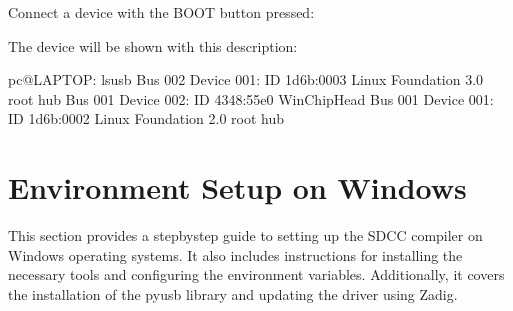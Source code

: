 \documentclass[letterpaper,10pt,english]{sphinxmanual}
\begin{document}
\sphinxAtStartPar
Connect a device with the BOOT button pressed:

\begin{sphinxVerbatim}[commandchars=\\\{\}]
\end{sphinxVerbatim}

\sphinxAtStartPar
The device will be shown with this description:

\begin{sphinxVerbatim}[commandchars=\\\{\}]
pc@LAPTOP:\PYGZti{}\PYGZdl{} lsusb
Bus 002 Device 001: ID 1d6b:0003 Linux Foundation 3.0 root hub
Bus 001 Device 002: ID 4348:55e0 WinChipHead
Bus 001 Device 001: ID 1d6b:0002 Linux Foundation 2.0 root hub
\end{sphinxVerbatim}

\sphinxstepscope


\chapter{Environment Setup on Windows}
\label{\detokenize{install_windows:environment-setup-on-windows}}\label{\detokenize{install_windows::doc}}
\sphinxAtStartPar
This section provides a step\sphinxhyphen{}by\sphinxhyphen{}step guide to setting up the SDCC compiler on Windows operating systems. It also includes instructions for installing the necessary tools and configuring the environment variables. Additionally, it covers the installation of the pyusb library and updating the driver using Zadig.
\end{document}
